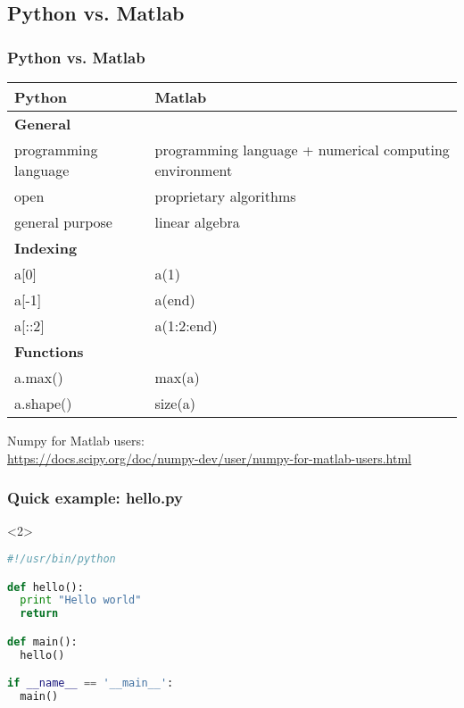 \subsection{Python vs. Matlab}

\begin{frame}[fragile]
\frametitle{Python vs. Matlab}
\footnotesize

\begin{table}
\scriptsize
\begin{tabular}{p{}p{}}
\toprule
Python  	  				& Matlab\\
\midrule
\textbf{General}			& \\
programming language		& programming language + numerical computing environment\\
open						& proprietary algorithms\\
general purpose				& linear algebra\\
\midrule
\textbf{Indexing} 			& 	\\
a[0]						& a(1) \\
a[-1]						& a(end)\\
a[::2]						& a(1:2:end)\\
\midrule
\textbf{Functions}			& \\
a.max()						& max(a)\\
a.shape()					& size(a)\\
\bottomrule
\end{tabular}
\end{table}

\vfill

Numpy for Matlab users:\\
\url{https://docs.scipy.org/doc/numpy-dev/user/numpy-for-matlab-users.html}

\end{frame}


\begin{frame}[t, fragile]
\frametitle{Quick example: hello.py}
\huge

\faLaptop


\begin{onlyenv}<2>
\begin{lstlisting}[language=python]
#!/usr/bin/python

def hello():
  print "Hello world"
  return

def main():
  hello()

if __name__ == '__main__':
  main()
\end{lstlisting}

\end{onlyenv}

\end{frame}

